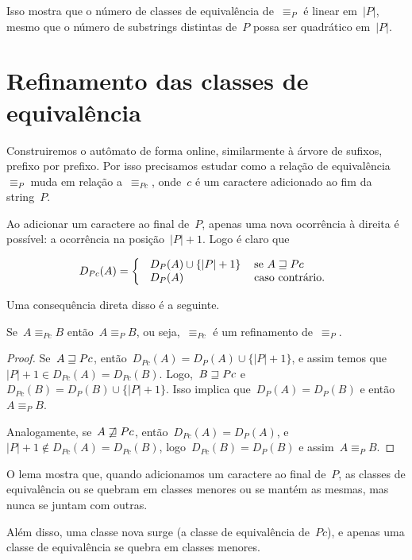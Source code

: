 Isso mostra que o número de classes de equivalência de~$\equiv_P$ é linear em~$|P|$, mesmo que o número de substrings distintas de~$P$ possa ser quadrático em~$|P|$.

\section{Refinamento das classes de equivalência}
\label{sec:refequiv}

Construiremos o autômato de forma online, similarmente à árvore de sufixos, prefixo por prefixo. Por isso precisamos estudar como a relação de equivalência~$\equiv_P$ muda em relação a~$\equiv_{Pc}$, onde~$c$ é um caractere adicionado ao fim da string~$P$.

Ao adicionar um caractere ao final de~$P$, apenas uma nova ocorrência à direita é possível: a ocorrência na posição~$|P| + 1$. Logo é claro que

\begin{equation}
\label{eq:dext}
D_{Pc}(A) =
\left \{
  \begin{tabular}{ll}
 ~$D_P(A) \cup \{|P| + 1\}$ & se~$A \suff Pc$ \\
 ~$D_P(A)$ & caso contrário.
  \end{tabular}
\right .
\end{equation}

Uma consequência direta disso é a seguinte.

\begin{prop} \label{prop:refin}
Se~$A \equiv_{Pc} B$ então~$A \equiv_P B$, ou seja,~$\equiv_{Pc}$ é um refinamento de~$\equiv_P$.
\end{prop}

\begin{proof}
Se~$A \sqsupseteq Pc$, então~$D_{Pc}(A) = D_P(A) \cup \{|P| + 1\}$, e assim temos que~${|P| + 1 \in D_{Pc}(A) = D_{Pc}(B)}$. Logo,~$B \sqsupseteq Pc$ e~$D_{Pc}(B) = D_P(B) \cup \{|P| + 1\}$. Isso implica que~$D_P(A) = D_P(B)$ e então~$A \equiv_P B$.

Analogamente, se~$A \not\sqsupseteq Pc$, então~${D_{Pc}(A) = D_P(A)}$, e~${|P|+1 \not\in D_{Pc}(A) = D_{Pc}(B)}$, logo~$D_{Pc}(B) = D_P(B)$ e assim~$A \equiv_P B$.
\end{proof}

O lema mostra que, quando adicionamos um caractere ao final de~$P$, as classes de equivalência ou se quebram em classes menores ou se mantém as mesmas, mas nunca se juntam com outras.


Além disso, uma classe nova surge (a classe de equivalência de~$Pc$), e apenas uma classe de equivalência se quebra em classes menores.

